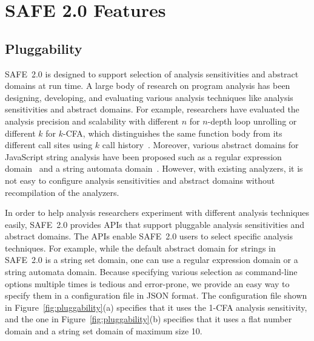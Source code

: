 \documentclass[10pt, conference]{IEEEtran}
\newcommand{\safe}{{SAFE~2.0}\xspace}
\begin{document}
\section{SAFE 2.0 Features}

\subsection{Pluggability}
\safe is designed to support selection of analysis sensitivities and
abstract domains at run time.  A large body of research on program
analysis has been designing, developing, and evaluating various
analysis techniques like analysis sensitivities and abstract domains.
For example, researchers have evaluated the analysis precision
and scalability with different $n$ for $n$-depth loop unrolling or
different $k$ for $k$-CFA, which distinguishes the same function body
from its different call sites using $k$ call history~\cite{SAFELSA}.
Moreover, various abstract domains for JavaScript string analysis
have been proposed such as a regular expression
domain~\cite{dls16} and a string automata domain~\cite{aplas14}.
However, with existing analyzers, it is not easy to configure analysis
sensitivities and abstract domains without recompilation of the analyzers.


In order to help analysis researchers experiment with different analysis
techniques easily, \safe provides APIs that support pluggable analysis
sensitivities and abstract domains.  The APIs enable \safe users
to select specific analysis techniques.  For example, while the default
abstract domain for strings in \safe is a string set domain, one can use
a regular expression domain or a string automata domain.
Because specifying various selection as command-line options multiple
times is tedious and error-prone, we provide an easy way to specify them
in a configuration file in JSON format.
The configuration file shown in Figure~\ref{fig:pluggability}(a)
specifies that it uses the 1-CFA analysis sensitivity, and the one in
Figure~\ref{fig:pluggability}(b) specifies that it uses a flat number
domain and a string set domain of maximum size 10.



\end{document}
